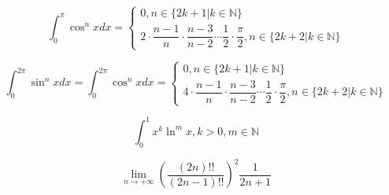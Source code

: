 \begin{theorem}[华里士公式]
\begin{corollary}[华里士公式推论]
	$$\int_{0}^{\pi}\cos^{n}x dx =
	\begin{cases} 
		0, n\in \{2k+1|k\in \mathbb{N}\} \\
		2\cdot\dfrac{n-1}{n}\cdot \dfrac{n-3}{n-2}\cdots \dfrac{1}{2}\cdot \dfrac{\pi}{2}, n\in \{2k+2|k\in \mathbb{N}\}  
	\end{cases}$$

	$$\int_{0}^{2\pi}\sin^{n}x dx = \int_{0}^{2\pi}\cos^{n} xdx =
	\begin{cases} 
		0, n\in \{2k+1|k\in \mathbb{N}\} \\
		4\cdot\dfrac{n-1}{n}\cdot \dfrac{n-3}{n-2}\cdots \dfrac{1}{2}\cdot \dfrac{\pi}{2}, n\in \{2k+2|k\in \mathbb{N}\}  
	\end{cases}$$
	\end{corollary}
\end{theorem}
\begin{proposition}
	$$\int_{0}^{1}x^{k}\ln^{m} x, k>0,m\in \mathbb{N}$$
\end{proposition}

\begin{proposition}
	$$\lim\limits_{n\to +\infty} \left(\dfrac{(2n)!!}{(2n-1)!!}\right)^{2}\dfrac{1}{2n+1}$$
\end{proposition}
